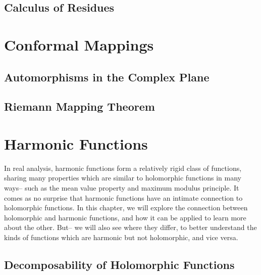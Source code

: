 \documentclass[oneside]{memoir}
\begin{document}


\section{Calculus of Residues}
\label{sec:calculus_of_residues}




\chapter{Conformal Mappings}
\label{cha:conformal_mappings}

\section{Automorphisms in the Complex Plane}
\label{sec:automorphisms_in_the_complex_plane}



\section{Riemann Mapping Theorem}
\label{sec:riemann_mapping_theorem}



\chapter{Harmonic Functions}
\label{cha:harmonic_functions}

In real analysis, harmonic functions form a relatively rigid class of functions, sharing many properties which are similar to holomorphic functions in many ways-- such as the mean value property and maximum modulus principle. It comes as no surprise that harmonic functions have an intimate connection to holomorphic functions. In this chapter, we will explore the connection between holomorphic and harmonic functions, and how it can be applied to learn more about the other. But-- we will also see where they differ, to better understand the kinds of functions which are harmonic but not holomorphic, and vice versa.

\section{Decomposability of Holomorphic Functions}
\label{sec:decomposability_of_holomorphic_functions}
\end{document}
